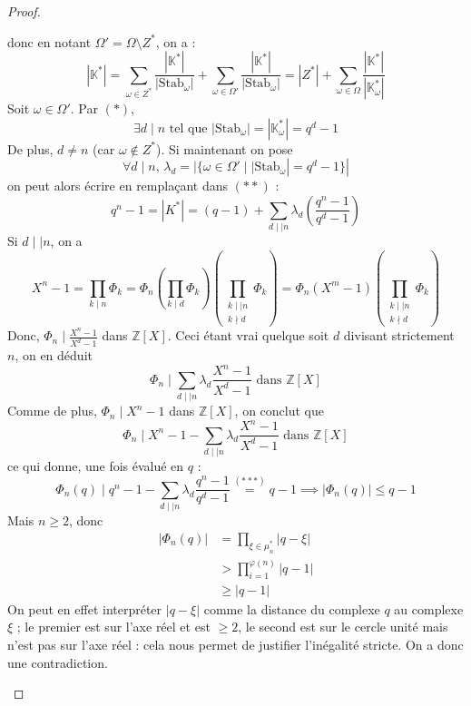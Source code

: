 \begin{proof}
\begin{itemize}
			donc en notant $\Omega' = \Omega \setminus Z^*$, on a :
			\[ |\mathbb{K}^*| = \sum_{\omega \in Z^*} \frac{|\mathbb{K}^*|}{|\mathrm{Stab}_\omega|} + \sum_{\omega \in \Omega'} \frac{|\mathbb{K}^*|}{|\mathrm{Stab}_\omega|} = |Z^*| + \sum_{\omega \in \Omega} \frac{|\mathbb{K}^*|}{|\mathbb{K}^*_\omega|} \tag{$**$} \]
			Soit $\omega \in \Omega'$. Par $(*)$,
			\[ \exists d \mid n \text{ tel que } |\mathrm{Stab}_\omega| = |\mathbb{K}^*_\omega| = q^d - 1 \]
			De plus, $d \neq n$ (car $\omega \notin Z^*$). Si maintenant on pose
			\[ \forall d \mid n, \, \lambda_d = |\{ \omega \in \Omega' \mid |\mathrm{Stab}_\omega| = q^d - 1 \}| \]
			on peut alors écrire en remplaçant dans $(**)$ :
			\[ q^n - 1 = |K^*| = (q - 1) + \sum_{d \mid \mid n} \lambda_d \left( \frac{q^n - 1}{q^d - 1} \right) \tag{$***$} \]
			Si $d \mid \mid n$, on a
			\[ X^n-1 = \prod_{k \mid n} \Phi_k = \Phi_n \left ( \prod_{k \mid d} \Phi_k \right ) \left ( \prod_{\substack{k \mid \mid n \\ k \nmid d}} \Phi_k \right ) = \Phi_n (X^m - 1) \left ( \prod_{\substack{k \mid \mid n \\ k \nmid d}} \Phi_k \right ) \]
			Donc, $\Phi_n \mid \frac{X^n - 1}{X^d - 1}$ dans $\mathbb{Z}[X]$. Ceci étant vrai quelque soit $d$ divisant strictement $n$, on en déduit
			\[ \Phi_n \mid \sum_{d \mid \mid n} \lambda_d \frac{X^n - 1}{X^d - 1} \text{ dans } \mathbb{Z}[X] \]
			Comme de plus, $\Phi_n \mid X^n - 1$ dans $\mathbb{Z}[X]$, on conclut que
			\[ \Phi_n \mid X^n - 1 - \sum_{d \mid \mid n} \lambda_d \frac{X^n - 1}{X^d - 1} \text{ dans } \mathbb{Z}[X] \]
			ce qui donne, une fois évalué en $q$ :
			\[ \Phi_n(q) \mid q^n - 1 - \sum_{d \mid \mid n} \lambda_d \frac{q^n - 1}{q^d - 1} \overset{(***)}{=} q-1 \implies |\Phi_n(q)| \leq q-1 \]
			Mais $n \geq 2$, donc
			\begin{align*}
				|\Phi_n(q)| &= \prod_{\xi \in \mu_n^*} |q - \xi| \\
				&> \prod_{i=1}^{\varphi(n)} |q - 1| \\
				&\geq |q-1|
			\end{align*}
			On peut en effet interpréter $|q - \xi|$ comme la distance du complexe $q$ au complexe $\xi$ ; le premier est sur l'axe réel et est $\geq 2$, le second est sur le cercle unité mais n'est pas sur l'axe réel :
			cela nous permet de justifier l'inégalité stricte. On a donc une contradiction.
		\end{itemize}
	\end{proof}

